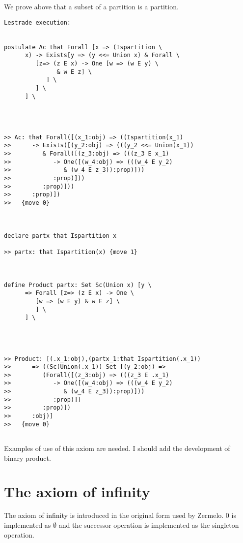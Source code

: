\documentclass[12pt]{article}
\begin{document}
We prove above that a subset of a partition is a partition.

\begin{verbatim}Lestrade execution:


postulate Ac that Forall [x => (Ispartition \
      x) -> Exists[y => (y <<= Union x) & Forall \
         [z=> (z E x) -> One [w => (w E y) \
               & w E z] \
            ] \
         ] \
      ] \
   



>> Ac: that Forall([(x_1:obj) => ((Ispartition(x_1)
>>      -> Exists([(y_2:obj) => (((y_2 <<= Union(x_1))
>>         & Forall([(z_3:obj) => (((z_3 E x_1)
>>            -> One([(w_4:obj) => (((w_4 E y_2)
>>               & (w_4 E z_3)):prop)]))
>>            :prop)]))
>>         :prop)]))
>>      :prop)])
>>   {move 0}



declare partx that Ispartition x

>> partx: that Ispartition(x) {move 1}



define Product partx: Set Sc(Union x) [y \
      => Forall [z=> (z E x) -> One \
         [w => (w E y) & w E z] \
         ] \
      ] \
   



>> Product: [(.x_1:obj),(partx_1:that Ispartition(.x_1))
>>      => ((Sc(Union(.x_1)) Set [(y_2:obj) =>
>>         (Forall([(z_3:obj) => (((z_3 E .x_1)
>>            -> One([(w_4:obj) => (((w_4 E y_2)
>>               & (w_4 E z_3)):prop)]))
>>            :prop)])
>>         :prop)])
>>      :obj)]
>>   {move 0}


\end{verbatim}

Examples of use of this axiom are needed.  I should add the development of binary product.


\section{The axiom of infinity}

The axiom of infinity is introduced in the original form used by Zermelo.  0 is implemented as $\emptyset$ and the successor operation is implemented as the singleton operation.
\end{document}
